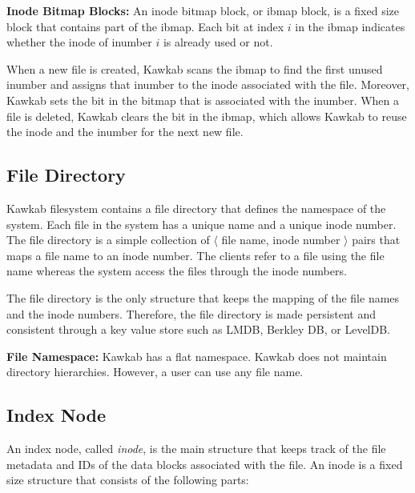 \documentclass[]{article}
\newcommand{\subtopic}[1]{\vspace{1.5pt} \noindent \textbf{#1}}
\begin{document}
\subtopic{Inode Bitmap Blocks:} An inode bitmap block, or ibmap block,
is a fixed size block that contains part of the ibmap. 
Each bit at index $i$ in the ibmap indicates whether the inode of inumber $i$ 
is already used or not. 

When a new file is created, Kawkab scans the ibmap to find the first unused 
inumber and assigns that inumber to the inode associated with the file. Moreover,
Kawkab sets the bit in the bitmap that is associated with the inumber.
When a file is deleted, Kawkab clears the bit in the ibmap, which allows
Kawkab to reuse the inode and the inumber for the next new file.


\subsection{File Directory} Kawkab filesystem contains a file directory that
defines the namespace of the system.
Each file in the system has a unique name and a unique inode number.  The file
directory is a simple collection of $\langle$ file name, inode number $\rangle$
pairs that maps a file name to an inode number.  The clients refer to a file
using the file name whereas the system access the files through the inode
numbers. 

The file directory is the only structure that keeps the mapping of the file
names and the inode numbers. Therefore, the file directory is made persistent
and consistent through a key value store such as LMDB, Berkley DB, or LevelDB.

\subtopic{File Namespace:} Kawkab has a flat namespace. Kawkab does not maintain
directory hierarchies. However, a user can use any file name.



\subsection{Index Node} An index node, called \textit{inode}, is the main
structure that keeps track of the file metadata and IDs of the data
blocks associated with the file. An inode is a fixed size structure that
consists of the following parts:
\end{document}
